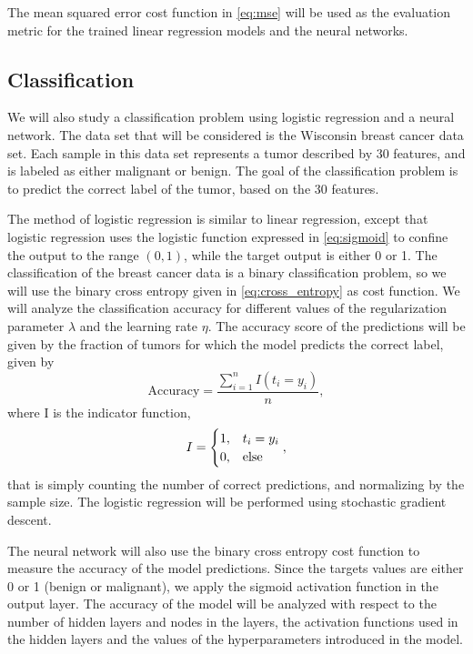 \documentclass[12pt]{article}
\begin{document}
The mean squared error cost function in \autoref{eq:mse} will be used as the evaluation metric for the trained linear regression models and the neural networks. 

\subsection{Classification}
We will also study a classification problem using logistic regression and a neural network. The data set that will be considered is the Wisconsin breast cancer data set\cite{breast_cancer_wisconsin}. Each sample in this data set represents a tumor described by 30 features, and is labeled as either malignant or benign. The goal of the classification problem is to predict the correct label of the tumor, based on the 30 features.

The method of logistic regression is similar to linear regression, except that logistic regression uses the logistic function expressed in \autoref{eq:sigmoid} to confine the output to the range $(0, 1)$, while the target output is either \num{0} or \num{1}. The classification of the breast cancer data is a binary classification problem, so we will use the binary cross entropy given in \autoref{eq:cross_entropy} as cost function. We will analyze the classification accuracy for different values of the regularization parameter $\lambda$ and the learning rate $\eta$. The accuracy score of the predictions will be given by the fraction of tumors for which the model predicts the correct label, given by
\begin{equation} \label{eq:acc_score}
    \text{Accuracy} = \frac{\sum_{i=1}^n I\left(t_i = y_i\right)}{n},
\end{equation}
where I is the indicator function,
\begin{equation}
    I = \begin{cases}
        1, & t_i = y_i \\
        0, & \rm else \\
    \end{cases},
\end{equation}
that is simply counting the number of correct predictions, and normalizing by the sample size. The logistic regression will be performed using stochastic gradient descent. 

The neural network will also use the binary cross entropy cost function to measure the accuracy of the model predictions. Since the targets values are either \num{0} or \num{1} (benign or malignant), we apply the sigmoid activation function in the output layer. The accuracy of the model will be analyzed with respect to the number of hidden layers and nodes in the layers, the activation functions used in the hidden layers and the values of the hyperparameters introduced in the model.
\end{document}
